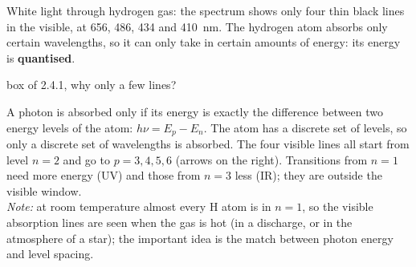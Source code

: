 White light through hydrogen gas: the spectrum shows only four thin black lines in the visible,
at 656, 486, 434 and 410~nm. The hydrogen atom absorbs only certain wavelengths, so it can only
take in certain amounts of energy: its energy is \textbf{quantised}.
\begin{handout}{box of 2.4.1, why only a few lines?}
\begin{minipage}{0.52\linewidth}\small
A photon is absorbed only if its energy is exactly the difference between two energy levels of the
atom: $h\nu = E_p - E_n$. The atom has a discrete set of levels, so only a discrete set of
wavelengths is absorbed. The four visible lines all start from level $n = 2$ and go to
$p = 3, 4, 5, 6$ (arrows on the right). Transitions from $n = 1$ need more energy (UV) and those from
$n = 3$ less (IR); they are outside the visible window.\\[3pt]
\emph{Note:} at room temperature almost every H atom is in $n = 1$, so the visible absorption lines are
seen when the gas is hot (in a discharge, or in the atmosphere of a star); the important idea is the
match between photon energy and level spacing.
\end{minipage}\hfill
\begin{minipage}{0.44\linewidth}\centering
{}
\end{minipage}
\end{handout}

